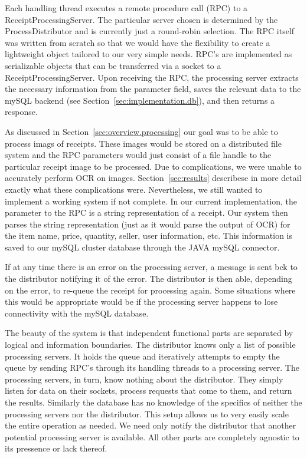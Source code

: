 Each handling thread executes a remote procedure call (RPC) to a
ReceiptProcessingServer. The particular server chosen is determined by
the ProcessDistributor and is currently just a round-robin
selection. The RPC itself was written from scratch so that we would
have the flexibility to create a lightweight object tailored to our
very simple needs. RPC's are implemented as serializable objects that
can be transferred via a socket to a ReceiptProcessingServer. Upon
receiving the RPC, the processing server extracts the necessary
information from the parameter field, saves the relevant data to the
mySQL backend (see Section~\ref{sec:implementation.db}), and then
returns a response.

As discussed in Section~\ref{sec:overview.processing} our goal was to
be able to process imags of receipts. These images would be stored on
a distributed file system and the RPC parameters would just consist of
a file handle to the particular receipt image to be processed. Due to
complications, we were unable to accurately perform OCR on
images. Section~\ref{sec:results} describese in more detail exactly
what these complications were. Nevertheless, we still wanted to
implement a working system if not complete. In our current
implementation, the parameter to the RPC is a string representation of
a receipt. Our system then parses the string representation (just as
it would parse the output of OCR) for the item name, price, quantity,
seller, user information, etc. This information is saved to our mySQL
cluster database through the JAVA mySQL connector.

If at any time there is an error on the processing server, a message
is sent bck to the distributor notifying it of the error. The
distributor is then able, depending on the error, to re-queue the
receipt for processing again. Some situations where this would be
appropriate would be if the processing server happens to lose
connectivity with the mySQL database.

The beauty of the system is that independent functional parts are
separated by logical and information boundaries. The distributor knows
only a list of possible processing servers. It holds the queue and
iteratively attempts to empty the queue by sending RPC's through its
handling threads to a processing server. The processing servers, in
turn, know nothing about the distributor. They simply listen for data
on their sockets, process requests that come to them, and return the
results. Similarly the database has no knowledge of the specifics of
neither the processing servers nor the distributor. This setup allows
us to very easily scale the entire operation as needed. We need only
notify the distributor that another potential processing server is
available. All other parts are completely agnostic to its pressence or
lack thereof.

